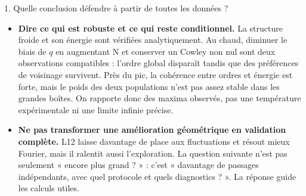 \begin{oral}{1. Quelle conclusion défendre à partir de toutes les données ?}

\begin{itemize}

\item \textbf{Dire ce qui est robuste et ce qui reste conditionnel.} La structure froide et son énergie sont vérifiées analytiquement. Au chaud, diminuer le biais de $q$ en augmentant N et conserver un Cowley non nul sont deux observations compatibles : l’ordre global disparaît tandis que des préférences de voisinage survivent. Près du pic, la cohérence entre ordres et énergie est forte, mais le poids des deux populations n’est pas assez stable dans les grandes boîtes. On rapporte donc des maxima observés, pas une température expérimentale ni une limite infinie précise.

\item \textbf{Ne pas transformer une amélioration géométrique en validation complète.} L12 laisse davantage de place aux fluctuations et résout mieux Fourier, mais il ralentit aussi l’exploration. La question suivante n’est pas seulement « encore plus grand ? » : c’est « davantage de passages indépendants, avec quel protocole et quels diagnostics ? ». La réponse guide les calculs utiles.

\end{itemize}\end{oral}
